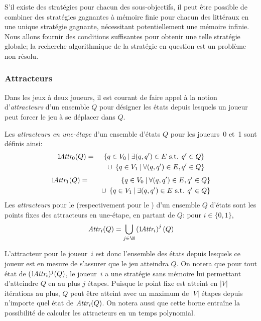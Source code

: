S'il existe des stratégies pour chacun des sous-objectifs, il peut être possible de combiner des stratégies gagnantes à mémoire finie pour chacun des littéraux en une unique stratégie gagnante, nécessitant potentiellement une mémoire infinie.
Nous allons fournir des conditions suffisantes pour obtenir une telle stratégie globale; la recherche algorithmique de la stratégie en question est un problème non résolu.

\subsubsection{Attracteurs}

Dans les jeux à deux joueurs, il est courant de faire appel à la notion d'\emph{attracteurs} d'un ensemble $Q$ pour désigner les états depuis lesquels un joueur peut forcer le jeu à se déplacer dans $Q$.

\begin{definition}
Les \emph{attracteurs en une-étape} d'un ensemble d'états $Q$ pour les joueurs~0 et~1 sont définis ainsi:
\begin{eqnarray*}
1\!\textit{Attr}_{0}(Q) &=& \left\{q \in V_0 \:\middle|\: \exists (q,q') \in E \textrm{ s.t. } q' \in Q \right\}
\\&&\quad
\cup \;\left\{q \in V_1 \:\middle|\: \forall (q,q') \in E, q' \in Q \right\}
\end{eqnarray*}
\begin{eqnarray*}
1\!\textit{Attr}_{1}(Q) &=& \left\{q \in V_0 \:\middle|\: \forall (q,q') \in E, q' \in Q \right\}
\\&&\quad
\cup \;\left\{q \in V_1 \:\middle|\: \exists (q,q') \in E \textrm{ s.t. } q' \in Q \right\}
\end{eqnarray*}
Les \emph{attracteurs} pour le \jo (respectivement pour le \ji) d'un ensemble $Q$ d'états sont les points fixes des attracteurs en une-étape, en partant de $Q$: pour $i \in \{0,1\}$, \[\attractor{i}(Q) = \bigcup_{j \in \N} \left(1\!\attractor{i}\right)^j(Q)\]
\end{definition}
L'attracteur pour le joueur~$i$ est donc l'ensemble des états depuis lesquels ce joueur est en mesure de s'assurer que le jeu atteindra $Q$.
On notera que pour tout état de $(1\!\textit{Attr}_{i})^j(Q)$, le joueur~$i$ a une stratégie sans mémoire lui permettant d'atteindre $Q$ en au plus $j$ étapes.
Puisque le point fixe est atteint en $|V|$ itérations au plus, $Q$ peut être atteint avec un maximum de $|V|$ étapes depuis n'importe quel état de $\textit{Attr}_{i}(Q)$.
On notera aussi que cette borne entraîne la possibilité de calculer les attracteurs en un temps polynomial.

